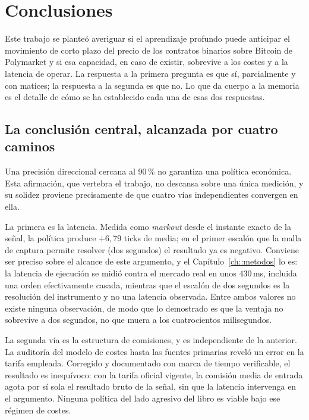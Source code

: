 %
\chapter{Conclusiones}
\label{ch::conclusiones}

Este trabajo se planteó averiguar si el aprendizaje profundo puede anticipar el movimiento
de corto plazo del precio de los contratos binarios sobre Bitcoin de Polymarket y si esa
capacidad, en caso de existir, sobrevive a los costes y a la latencia de operar. La
respuesta a la primera pregunta es que sí, parcialmente y con matices; la respuesta a la
segunda es que no. Lo que da cuerpo a la memoria es el detalle de cómo se ha establecido
cada una de esas dos respuestas.

\section{La conclusión central, alcanzada por cuatro caminos}

Una precisión direccional cercana al 90\,\% no garantiza una política económica. Esta
afirmación, que vertebra el trabajo, no descansa sobre una única medición, y su solidez
proviene precisamente de que cuatro vías independientes convergen en ella.

La primera es la latencia. Medida como \emph{markout} desde el instante exacto de la señal,
la política produce $+6{,}79$ ticks de media; en el primer escalón que la malla de captura
permite resolver (dos segundos) el resultado ya es negativo. Conviene ser preciso sobre el
alcance de este argumento, y el Capítulo~\ref{ch::metodos} lo es: la latencia de ejecución
se midió contra el mercado real en unos $430$\,ms, incluida una orden efectivamente casada,
mientras que el escalón de dos segundos es la resolución del instrumento y no una latencia
observada. Entre ambos valores no existe ninguna observación, de modo que lo demostrado es
que la ventaja no sobrevive a dos segundos, no que muera a los cuatrocientos milisegundos.

La segunda vía es la estructura de comisiones, y es independiente de la anterior. La
auditoría del modelo de costes hasta las fuentes primarias reveló un error en la tarifa
empleada. Corregido y documentado con marca de tiempo verificable, el resultado es
inequívoco: con la tarifa oficial vigente, la comisión media de entrada agota por sí sola
el resultado bruto de la señal, sin que la latencia intervenga en el argumento. Ninguna
política del lado agresivo del libro es viable bajo ese régimen de costes.

